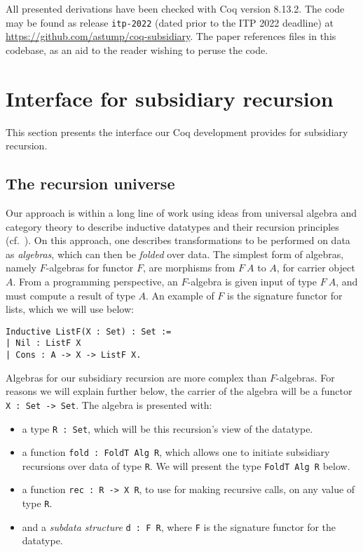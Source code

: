 \documentclass[a4paper,USenglish]{lipics-v2021}
\begin{document}
All presented derivations have been checked with Coq version 8.13.2.  The code may be
found as release \verb|itp-2022| (dated prior to the ITP 2022
deadline) at \url{https://github.com/astump/coq-subsidiary}.  The
paper references files in this codebase, as an aid to the reader
wishing to peruse the code.

\section{Interface for subsidiary recursion}
\label{sec:interface}

This section presents the interface our Coq development provides
for subsidiary recursion.

\subsection{The recursion universe}
\label{sec:recu}

Our approach is within a long line of work using ideas from universal
algebra and category theory to describe inductive datatypes and their
recursion principles (cf.~\cite{traytel12,cockett92,hagino87}).  On this approach, one describes transformations
to be performed on data as \emph{algebras}, which can then be
\textit{folded} over data.  The simplest form of algebras, namely
$F$-algebras for functor $F$, are morphisms from $F\ A$ to $A$, for carrier object
$A$.  From a programming perspective, an $F$-algebra is given input of
type $F\ A$, and must compute a result of type $A$.  An example of $F$
is the signature functor for lists, which we will use below:

\begin{verbatim}
Inductive ListF(X : Set) : Set :=
| Nil : ListF X
| Cons : A -> X -> ListF X.
\end{verbatim}

Algebras for our subsidiary recursion are more complex than
$F$-algebras.  For reasons we will explain further below, the carrier
of the algebra will be a functor \verb|X : Set -> Set|.  The algebra
is presented with:

\begin{itemize}
\item a type \verb|R : Set|, which will be this recursion's view of the datatype.
\item a function \verb|fold : FoldT Alg R|, which allows one to
  initiate subsidiary recursions over data of type \verb|R|.  We will
  present the type \verb|FoldT Alg R| below.
\item a function \verb|rec : R -> X R|, to use for making recursive calls, on any value of type \verb|R|.
\item and a \emph{subdata structure} \verb|d : F R|, where \verb|F| is the signature functor for the datatype.
\end{itemize}
\end{document}
